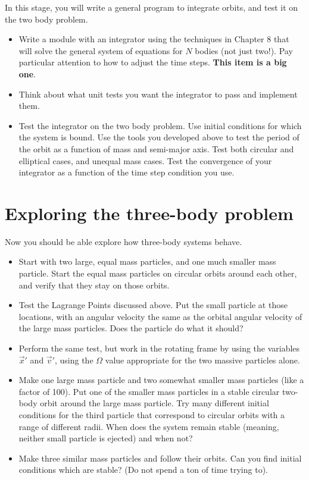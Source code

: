 \documentclass[11pt, preprint]{aastex}
\begin{document}
In this stage, you will write a general program to integrate orbits,
and test it on the two body problem.
  
\begin{itemize}
\item Write a module with an integrator using the techniques in
  Chapter 8 that will solve the general system of equations for $N$
  bodies (not just two!). Pay particular attention to how to adjust
  the time steps. {\bf This item is a big one}.
\item Think about what unit tests you want the integrator to pass and
  implement them.
\item Test the integrator on the two body problem. Use initial
  conditions for which the system is bound. Use the tools you
  developed above to test the period of the orbit as a function of
  mass and semi-major axis. Test both circular and elliptical cases,
  and unequal mass cases. Test the convergence of your integrator as a
  function of the time step condition you use.
\end{itemize}

\section{Exploring the three-body problem}

Now you should be able explore how three-body systems behave. 

\begin{itemize}
\item Start with two large, equal mass particles, and one much smaller
  mass particle. Start the equal mass particles on circular orbits
  around each other, and verify that they stay on those orbits.
\item Test the Lagrange Points discussed above.  Put the small
  particle at those locations, with an angular velocity the same as
  the orbital angular velocity of the large mass particles. Does the
  particle do what it should?
\item Perform the same test, but work in the rotating frame by using
  the variables $\vec{x}'$ and $\vec{v}'$, using the $\Omega$ value
  appropriate for the two massive particles alone. 
\item Make one large mass particle and two somewhat smaller mass
  particles (like a factor of 100). Put one of the smaller mass
  particles in a stable circular two-body orbit around the large mass
  particle. Try many different initial conditions for the third
  particle that correspond to circular orbits with a range of
  different radii. When does the system remain stable (meaning,
  neither small particle is ejected) and when not?
\item Make three similar mass particles and follow their orbits. Can
  you find initial conditions which are stable? (Do not spend a ton of
  time trying to).
\end{itemize}
\end{document}
